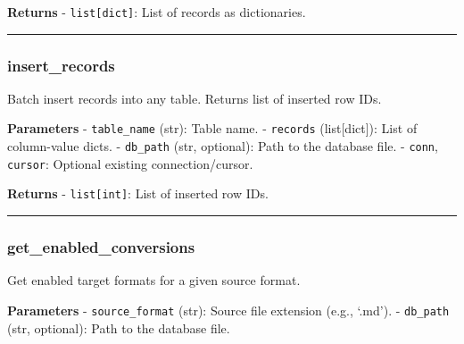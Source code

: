 \textbf{Returns} - \texttt{list{[}dict{]}}: List of records as
dictionaries.

\begin{center}\rule{0.5\linewidth}{0.5pt}\end{center}

\subsubsection{insert\_records}\label{insert_records}

\begin{Shaded}
\begin{Highlighting}[]
\OperatorTok{=}\OperatorTok{=}\OperatorTok{=}\NormalTok{)}
\end{Highlighting}
\end{Shaded}

Batch insert records into any table. Returns list of inserted row IDs.

\textbf{Parameters} - \texttt{table\_name} (str): Table name. -
\texttt{records} (list{[}dict{]}): List of column-value dicts. -
\texttt{db\_path} (str, optional): Path to the database file. -
\texttt{conn}, \texttt{cursor}: Optional existing connection/cursor.

\textbf{Returns} - \texttt{list{[}int{]}}: List of inserted row IDs.

\begin{center}\rule{0.5\linewidth}{0.5pt}\end{center}

\subsubsection{get\_enabled\_conversions}\label{get_enabled_conversions}

\begin{Shaded}
\begin{Highlighting}[]
\OperatorTok{=}\NormalTok{)}
\end{Highlighting}
\end{Shaded}

Get enabled target formats for a given source format.

\textbf{Parameters} - \texttt{source\_format} (str): Source file
extension (e.g., `.md'). - \texttt{db\_path} (str, optional): Path to
the database file.

